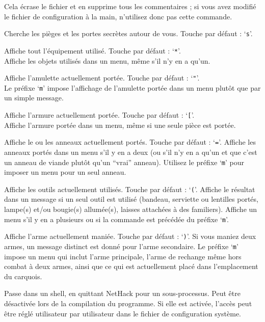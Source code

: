 \documentclass[titlepage]{article}
\begin{document}
\begin{description}[font=\mdseries\ttfamily]
Cela écrase le fichier et en supprime tous les commentaires ; si vous avez
modifié le fichier de configuration à la main, n'utilisez donc pas cette commande.
\item[\#search]
Cherche les pièges et les portes secrètes autour de vous. Touche par défaut : `\texttt{s}'.
\item[\#seeall]
Affiche tout l'équipement utilisé. Touche par défaut : `\texttt{*}'.
\\
Affiche les objets utilisés dans un menu, même s'il n'y en a qu'un.
\item[\#seeamulet]
Affiche l'amulette actuellement portée. Touche par défaut : `\texttt{"}'.
\\
Le préfixe `\texttt{m}' impose l'affichage de l'amulette portée
dans un menu plutôt que par un simple message.
\item[\#seearmor]
Affiche l'armure actuellement portée. Touche par défaut : `\texttt{[}'.
\\
Affiche l'armure portée dans un menu, même si une seule pièce est portée.
\item[\#seerings]
Affiche le ou les anneaux actuellement portés. Touche par défaut : `\texttt{=}'.
Affiche les anneaux portés dans un menu s'il y en a deux (ou s'il n'y en a
qu'un et que c'est un anneau de viande plutôt qu'un ``vrai'' anneau).
Utilisez le préfixe `\texttt{m}' pour imposer un menu pour un seul anneau.
\item[\#seetools]
Affiche les outils actuellement utilisés. Touche par défaut : `\texttt{(}'.
Affiche le résultat dans un message si un seul outil est utilisé (bandeau,
serviette ou lentilles portés, lampe(s) et/ou bougie(s) allumée(s), laisses
attachées à des familiers).
Affiche un menu s'il y en a plusieurs ou si la commande est
précédée du préfixe `\texttt{m}'.
\item[\#seeweapon]
Affiche l'arme actuellement maniée. Touche par défaut : `\texttt{)}'.
Si vous maniez deux armes, un message distinct est donné pour l'arme
secondaire.
Le préfixe `\texttt{m}' impose un menu qui inclut
l'arme principale, l'arme de rechange même hors combat à deux armes, ainsi que
ce qui est actuellement placé dans l'emplacement du carquois.
\item[\#shell]
Passe dans un shell, en quittant NetHack pour un sous-processus.
Peut être désactivée lors de la compilation du programme.
Si elle est activée, l'accès peut être réglé utilisateur par utilisateur dans
le fichier de configuration système.

\end{description}
\end{document}
